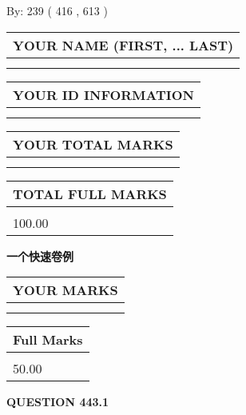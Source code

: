 \documentclass{ctexart}
\begin{document}
   
\hspace{1.0in} By: 
 239 ( 416 ,  613 )
   
   
   
   
\newpage 
\setcounter{page}{ 
   443001 } 
   
   
   
   
\noindent\begin{tabular}{|l|}
\hline
YOUR NAME (FIRST, ... LAST)  \\
\hline
 \\ 
 \\ 
\hline
\end{tabular}
\hspace{0.05in} \begin{tabular}{|l|}
\hline
 YOUR   ID   INFORMATION  \\
\hline
 \\ 
 \\ 
\hline
\end{tabular}
   
   
\vspace{0.2in}\noindent\begin{tabular}{|l|}
\hline
YOUR TOTAL MARKS  \\
\hline
 \\ 
 \\ 
\hline
\end{tabular}
\hspace{0.05in} \begin{tabular}{|l|}
\hline
TOTAL FULL MARKS  \\
\hline
 \\ 
100.00 \\
\hline
\end{tabular}
   
   
 \vspace{0.2in}
{\LARGE {\textbf{ 一个快速卷例}}}
   
   
  
\vspace{0.2in}
  
\noindent\begin{tabular}{|l|}
\hline
 YOUR MARKS  \\
\hline
 \\ 
 \\ 
\hline
\end{tabular}
\hspace{0.05in} \begin{tabular}{|l|}
\hline
 Full Marks  \\
\hline
 \\ 
50.00 \\
\hline
\end{tabular}
{\textbf{\Large{QUESTION
443.1 
}}}
  
\end{document}
